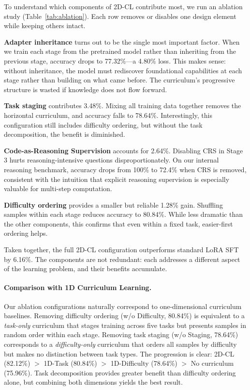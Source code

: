 \documentclass[journal]{IEEEtran}
\newcommand{\method}{2D-CL}
\newcommand{\crs}{CRS}
\begin{document}
To understand which components of \method{} contribute most, we run an ablation study (Table~\ref{tab:ablation}). Each row removes or disables one design element while keeping others intact.

\textbf{Adapter inheritance} turns out to be the single most important factor. When we train each stage from the pretrained model rather than inheriting from the previous stage, accuracy drops to 77.32\%---a 4.80\% loss. This makes sense: without inheritance, the model must rediscover foundational capabilities at each stage rather than building on what came before. The curriculum's progressive structure is wasted if knowledge does not flow forward.

\textbf{Task staging} contributes 3.48\%. Mixing all training data together removes the horizontal curriculum, and accuracy falls to 78.64\%. Interestingly, this configuration still includes difficulty ordering, but without the task decomposition, the benefit is diminished.

\textbf{Code-as-Reasoning Supervision} accounts for 2.64\%. Disabling \crs{} in Stage 3 hurts reasoning-intensive questions disproportionately. On our internal reasoning benchmark, accuracy drops from 100\% to 72.4\% when \crs{} is removed, consistent with the intuition that explicit reasoning supervision is especially valuable for multi-step computation.

\textbf{Difficulty ordering} provides a smaller but reliable 1.28\% gain. Shuffling samples within each stage reduces accuracy to 80.84\%. While less dramatic than the other components, this confirms that even within a fixed task, easier-first ordering helps.

Taken together, the full \method{} configuration outperforms standard LoRA SFT by 6.16\%. The components are not redundant: each addresses a different aspect of the learning problem, and their benefits accumulate.

\paragraph{Comparison with 1D Curriculum Learning.}
Our ablation configurations naturally correspond to one-dimensional curriculum baselines. Removing difficulty ordering (w/o Difficulty, 80.84\%) is equivalent to a \emph{task-only} curriculum that stages training across five tasks but presents samples in random order within each stage. Removing task staging (w/o Staging, 78.64\%) corresponds to a \emph{difficulty-only} curriculum that orders all samples by difficulty but makes no distinction between task types. The progression is clear: 2D-CL (82.12\%) $>$ 1D-Task (80.84\%) $>$ 1D-Difficulty (78.64\%) $>$ No curriculum (75.96\%). Task decomposition provides greater benefit than difficulty ordering alone, but combining both dimensions yields the best result.
\end{document}
